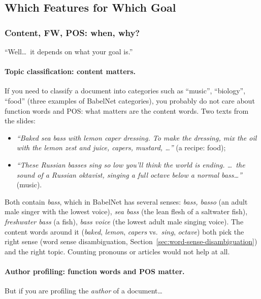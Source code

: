 \subsection{Which Features for Which Goal}
\label{sec:choosing-features}

\subsubsection{Content, FW, POS: when, why?}

``Well\ldots\ it depends on what your goal is.''

\paragraph{Topic classification: content matters.}
If you need to classify a document into categories such as ``music'', ``biology'',
``food'' (three examples of BabelNet categories), you probably do not care about function
words and POS: what matters are the content words. Two texts from the slides:
\begin{itemize}[nosep]
  \item \emph{``Baked sea bass with lemon caper dressing. To make the dressing, mix the
        oil with the lemon zest and juice, capers, mustard, \ldots''} (a recipe: food);
  \item \emph{``These Russian basses sing so low you'll think the world is ending.
        \ldots\ the sound of a Russian oktavist, singing a full octave below a normal
        bass\ldots''} (music).
\end{itemize}
Both contain \emph{bass}, which in BabelNet has several senses: \emph{bass, basso} (an
adult male singer with the lowest voice), \emph{sea bass} (the lean flesh of a saltwater
fish), \emph{freshwater bass} (a fish), \emph{bass voice} (the lowest adult male singing
voice). The content words around it (\emph{baked}, \emph{lemon}, \emph{capers} vs.\
\emph{sing}, \emph{octave}) both pick the right sense (word sense disambiguation,
Section~\ref{sec:word-sense-disambiguation}) and the right topic. Counting pronouns or
articles would not help at all.

\paragraph{Author profiling: function words and POS matter.}
But if you are profiling the \emph{author} of a document\ldots

